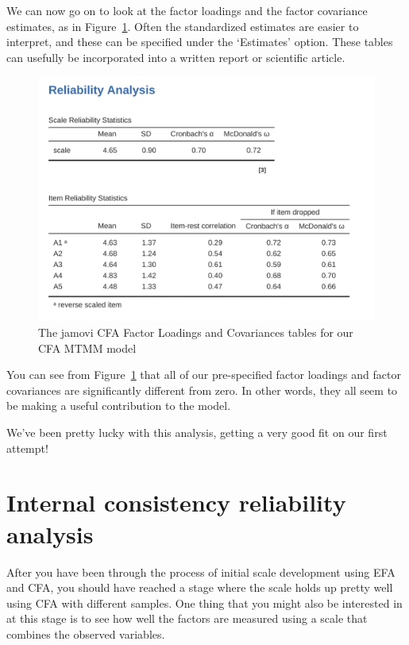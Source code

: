 \documentclass[
  a4paper,
]{book}
\begin{document}
We can now go on to look at the factor loadings and the factor
covariance estimates, as in Figure~\ref{fig-fig15-26}. Often the
standardized estimates are easier to interpret, and these can be
specified under the `Estimates' option. These tables can usefully be
incorporated into a written report or scientific article.

\begin{figure}

\includegraphics[width=1\textwidth,height=\textheight]{images/fig15-26.png} \hfill{}

\caption{\label{fig-fig15-26}The jamovi CFA Factor Loadings and
Covariances tables for our CFA MTMM model}

\end{figure}

You can see from Figure~\ref{fig-fig15-26} that all of our pre-specified
factor loadings and factor covariances are significantly different from
zero. In other words, they all seem to be making a useful contribution
to the model.

We've been pretty lucky with this analysis, getting a very good fit on
our first attempt!

\hypertarget{sec-Internal-consistency-reliability-analysis}{%
\section{Internal consistency reliability
analysis}\label{sec-Internal-consistency-reliability-analysis}}

After you have been through the process of initial scale development
using EFA and CFA, you should have reached a stage where the scale holds
up pretty well using CFA with different samples. One thing that you
might also be interested in at this stage is to see how well the factors
are measured using a scale that combines the observed variables.
\end{document}
